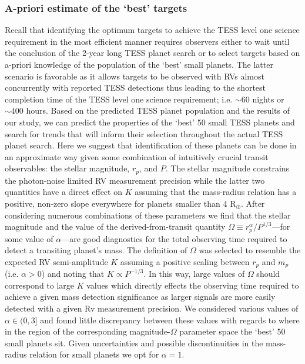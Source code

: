 \subsubsection{A-priori estimate of the `best' targets}
Recall that identifying the optimum targets to achieve the TESS level one
science requirement in the most efficient
manner requires observers either to wait until the conclusion of the 2-year long TESS planet search
or to select targets based on a-priori knowledge of the population of the `best' small planets.
The latter scenario is favorable
as it allows targets to be observed with RVs almost concurrently with reported TESS detections thus
leading to the shortest completion time of the TESS level one science requirement; i.e. $\sim 60$
nights or $\sim 400$ hours.
Based on the predicted TESS planet population  and the results of our study,
we can predict the properties of the `best' 50 small TESS planets and search for trends that will inform
their selection throughout the actual TESS planet search. 
Here we suggest that identification of these planets can be done in an approximate way
given some combination of intuitively crucial transit observables: the stellar magnitude, $r_p$, and $P$.
The stellar magnitude constrains the photon-noise limited RV measurement precision while the latter two
quantities have a direct effect on $K$ assuming that the mass-radius relation has a positive, non-zero slope
everywhere for planets
smaller than 4 R$_{\oplus}$. After considering numerous combinations of these parameters we find that the
stellar magnitude and the value of the derived-from-transit
quantity $\Omega \equiv r_p^{\alpha}/P^{1/3}$---for some value of $\alpha$---are
good diagnostics for the total observing time required to detect a transiting planet's mass. The
definition of $\Omega$ was selected to resemble the expected RV semi-amplitude $K$ assuming a
positive scaling between $r_p$ and $m_p$ (i.e. $\alpha > 0$) and noting that $K \propto P^{-1/3}$.
In this way, large values of $\Omega$ should correspond to large $K$ values which directly effects the observing
time required to achieve a given mass detection significance as larger signals are more easily detected with
a given Rv measurement precision. We considered various values of $\alpha \in (0,3]$
and found little discrepancy between these values with regards to where in the region of the corresponding
magnitude-$\Omega$ parameter space the `best' 50 small planets sit. Given uncertainties and possible discontinuities
in the mass-radius relation for small planets we opt for $\alpha =1$. \\

